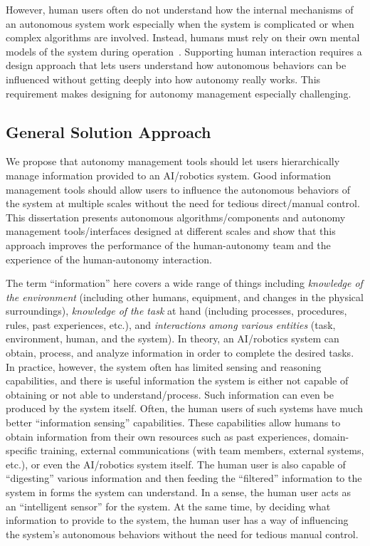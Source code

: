 However, human users often do not understand how the internal mechanisms of an autonomous system work especially when the system is complicated or when complex algorithms are involved. Instead, humans must rely on their own mental models of the system during operation~\cite{Moray1999Mental}. Supporting human interaction requires a design approach that lets users understand how autonomous behaviors can be influenced without getting deeply into how autonomy really works. This requirement makes designing for autonomy management especially challenging.

\subsection{General Solution Approach}

We propose that autonomy management tools should let users hierarchically manage information provided to an AI/robotics system. Good information management tools should allow users to influence the autonomous behaviors of the system at multiple scales without the need for tedious direct/manual control. This dissertation presents autonomous algorithms/components and autonomy management tools/interfaces designed at different scales and show that this approach improves the performance of the human-autonomy team and the experience of the human-autonomy interaction.

The term ``information'' here covers a wide range of things including \textit{knowledge of the environment} (including other humans, equipment, and changes in the physical surroundings), \textit{knowledge of the task} at hand (including processes, procedures, rules, past experiences, etc.), and \textit{interactions among various entities} (task, environment, human, and the system). In theory, an AI/robotics system can obtain, process, and analyze information in order to complete the desired tasks. In practice, however, the system often has limited sensing and reasoning capabilities, and there is useful information the system is either not capable of obtaining or not able to understand/process. Such information can even be produced by the system itself. Often, the human users of such systems have much better ``information sensing'' capabilities. These capabilities allow humans to obtain information from their own resources such as past experiences, domain-specific training, external communications (with team members, external systems, etc.), or even the AI/robotics system itself. The human user is also capable of ``digesting'' various information and then feeding the ``filtered'' information to the system in forms the system can understand. In a sense, the human user acts as an ``intelligent sensor'' for the system. At the same time, by deciding what information to provide to the system, the human user has a way of influencing the system's autonomous behaviors without the need for tedious manual control.

